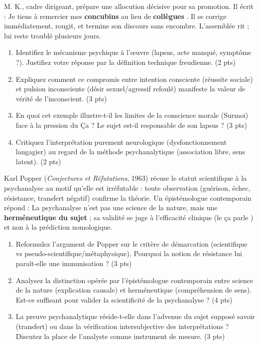 \documentclass[11pt]{article}
\begin{document}
\begin{exercice}
M. K., cadre dirigeant, prépare une allocution décisive pour sa promotion. Il écrit : \og Je tiens à remercier mes \textbf{concubins} \fg{} au lieu de \og \textbf{collègues} \fg{}. Il se corrige immédiatement, rougit, et termine son discours sans encombre. L'assemblée rit ; lui reste troublé plusieurs jours.
\begin{enumerate}
    \item Identifiez le mécanisme psychique à l'œuvre (lapsus, acte manqué, symptôme ?). Justifiez votre réponse par la définition technique freudienne. (2 pts)
    \item Expliquez comment ce \og compromis \fg{} entre intention consciente (réussite sociale) et pulsion inconsciente (désir sexuel/agressif refoulé) manifeste la \og valeur de vérité \fg{} de l'inconscient. (3 pts)
    \item En quoi cet exemple illustre-t-il les \og limites de la conscience morale \fg{} (Surmoi) face à la pression du Ça ? Le sujet est-il responsable de son lapsus ? (3 pts)
    \item Critiquez l'interprétation purement \og neurologique \fg{} (dysfonctionnement langagier) au regard de la méthode psychanalytique (association libre, sens latent). (2 pts)
\end{enumerate}
\end{exercice}

\begin{exercice}
Karl Popper (\textit{Conjectures et Réfutations}, 1963) récuse le statut scientifique à la psychanalyse au motif qu'elle est \og irréfutable \fg{} : toute observation (guérison, échec, résistance, transfert négatif) confirme la théorie. Un épistémologue contemporain répond : \og La psychanalyse n'est pas une science de la nature, mais une \textbf{herméneutique du sujet} ; sa validité se juge à l'efficacité clinique (le \og ça parle \fg{}) et non à la prédiction nomologique. \fg{}
\begin{enumerate}
    \item Reformulez l'argument de Popper sur le critère de démarcation (scientifique vs pseudo-scientifique/métaphysique). Pourquoi la notion de \og résistance \fg{} lui paraît-elle une \og immunisation \fg{} ? (3 pts)
    \item Analysez la distinction opérée par l'épistémologue contemporain entre \og science de la nature \fg{} (explication causale) et \og herméneutique \fg{} (compréhension de sens). Est-ce suffisant pour valider la \og scientificité \fg{} de la psychanalyse ? (4 pts)
    \item La \og preuve \fg{} psychanalytique réside-t-elle dans l'advenue du \og sujet supposé savoir \fg{} (transfert) ou dans la vérification intersubjective des interprétations ? Discutez la place de l'analyste comme instrument de mesure. (3 pts)
\end{enumerate}
\end{exercice}
\end{document}
